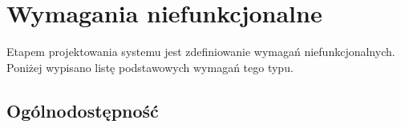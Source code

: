 \section{Wymagania niefunkcjonalne}

Etapem projektowania systemu jest zdefiniowanie wymagań niefunkcjonalnych. Poniżej wypisano listę podstawowych wymagań tego typu.

\subsection{Ogólnodostępność}

